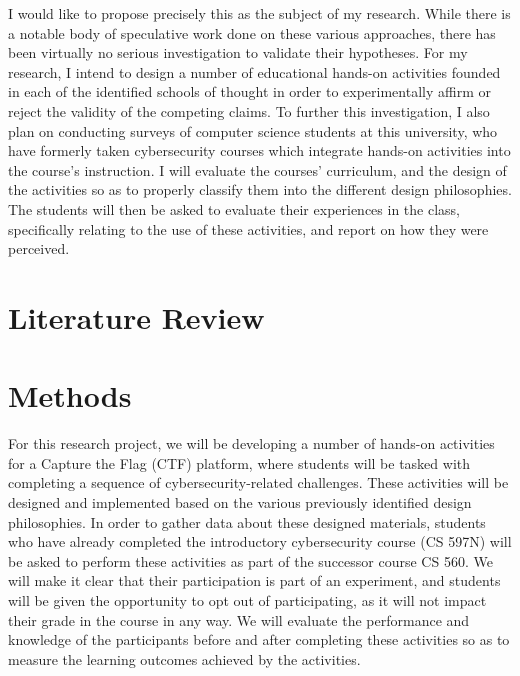 \documentclass{article}
\begin{document}
    I would like to propose precisely this as the subject of my research. 
    While there is a notable body of speculative work done on these various approaches, there has been virtually no serious investigation to validate their hypotheses. 
    For my research, I intend to design a number of educational hands-on activities founded in each of the identified schools of thought in order to experimentally affirm or reject the validity of the competing claims.
    To further this investigation, I also plan on conducting surveys of computer science students at this university, who have formerly taken cybersecurity courses which integrate hands-on activities into the course's instruction. 
    I will evaluate the courses' curriculum, and the design of the activities so as to properly classify them into the different design philosophies. 
    The students will then be asked to evaluate their experiences in the class, specifically relating to the use of these activities, and report on how they were perceived. 

\section{Literature Review}

    

\section{Methods}

    For this research project, we will be developing a number of hands-on activities for a Capture the Flag (CTF) platform, where students will be tasked with completing a sequence of cybersecurity-related challenges.
    These activities will be designed and implemented based on the various previously identified design philosophies. 
    In order to gather data about these designed materials, students who have already completed the introductory cybersecurity course (CS 597N) will be asked to perform these activities as part of the successor course CS 560.
    We will make it clear that their participation is part of an experiment, and students will be given the opportunity to opt out of participating, as it will not impact their grade in the course in any way.
    We will evaluate the performance and knowledge of the participants before and after completing these activities so as to measure the learning outcomes achieved by the activities. 
\end{document}
